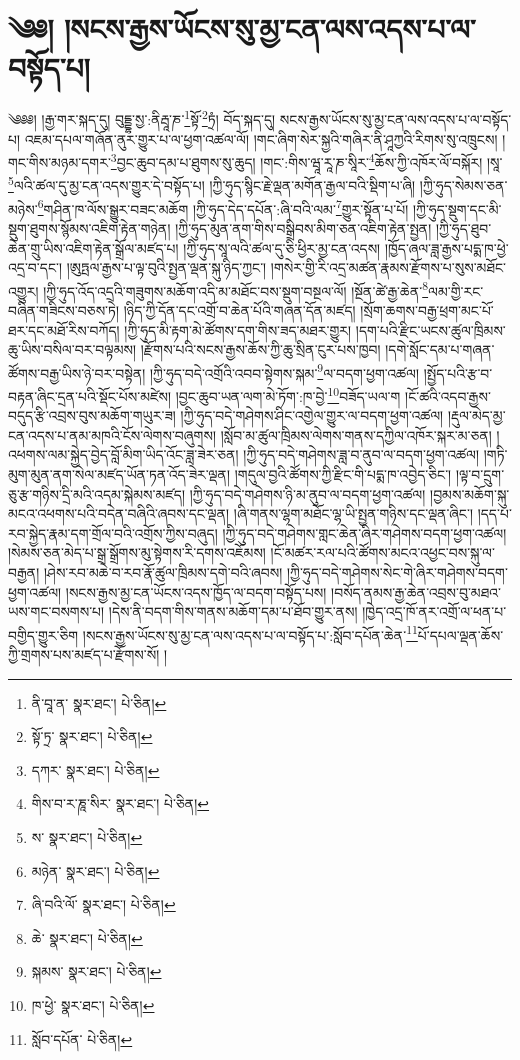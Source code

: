 \setcounter{footnote}{0} 
\chapter{༄༅། །སངས་རྒྱས་ཡོངས་སུ་མྱ་ངན་ལས་འདས་པ་ལ་བསྟོད་པ།}༄༅༅། །རྒྱ་གར་སྐད་དུ། བུདྡྷ་སྱ་:ནིརྦཱ་ཎ་\footnote{ནི་བཱ་ན་  སྣར་ཐང་།  པེ་ཅིན། }སྟོ་\footnote{སྟོ་ཏྲ་  སྣར་ཐང་།  པེ་ཅིན། }ཏྲཾ། བོད་སྐད་དུ། སངས་རྒྱས་ཡོངས་སུ་མྱ་ངན་ལས་འདས་པ་ལ་བསྟོད་པ། འཇམ་དཔལ་གཞོན་ནུར་གྱུར་པ་ལ་ཕྱག་འཚལ་ལོ། །གང་ཞིག་སེར་སྐྱའི་གཞིར་ནི་ཤཱཀྱའི་རིགས་སུ་འཁྲུངས། །གང་གིས་མཉམ་དགར་\footnote{དཀར་  སྣར་ཐང་།  པེ་ཅིན། }བྱང་ཆུབ་དམ་པ་ཐུགས་སུ་ཆུད། །གང་:གིས་ཝཱ་རཱ་ཎ་སཱིར་\footnote{གིས་བ་ར་ཎཱ་སིར་  སྣར་ཐང་།  པེ་ཅིན། }ཆོས་ཀྱི་འཁོར་ལོ་བསྐོར། །སཱ་\footnote{ས་  སྣར་ཐང་།  པེ་ཅིན། }ལའི་ཚལ་དུ་མྱ་ངན་འདས་གྱུར་དེ་བསྟོད་པ། །ཀྱི་ཧུད་སྙིང་རྗེ་ལྡན་མགོན་རྒྱལ་བའི་སྡིག་པ་ཞི། །ཀྱི་ཧུད་སེམས་ཅན་མཉེས་\footnote{མཉེན་  སྣར་ཐང་།  པེ་ཅིན། }གཤིན་ཁ་ལོས་སྒྱུར་བཟང་མཆོག །ཀྱི་ཧུད་དེད་དཔོན་:ཞི་བའི་ལམ་\footnote{ཞི་བའི་ལོ་  སྣར་ཐང་།  པེ་ཅིན། }གྱུར་སྟོན་པ་པོ། །ཀྱི་ཧུད་སྡུག་དང་མི་སྡུག་ཐུགས་སྙོམས་འཇིག་རྟེན་གཉེན། །ཀྱི་ཧུད་མུན་ནག་གིས་བསྒྲིབས་མིག་ཅན་འཇིག་རྟེན་སྤྱན། །ཀྱི་ཧུད་ཐུབ་ཆེན་གྲུ་ཡིས་འཇིག་རྟེན་སྒྲོལ་མཛད་པ། །ཀྱི་ཧུད་སཱ་ལའི་ཚལ་དུ་ཅི་ཕྱིར་མྱ་ངན་འདས། །ཁྱོད་ཞལ་ཟླ་རྒྱས་པདྨ་ཁ་ཕྱེ་འདྲ་བ་དང་། །ཨུཏྤལ་རྒྱས་པ་ལྟ་བུའི་སྤྱན་ལྡན་སྐུ་ཉིད་ཀྱང་། །གསེར་གྱི་རི་འདྲ་མཚན་རྣམས་རྫོགས་པ་སུས་མཐོང་འགྱུར། །ཀྱི་ཧུད་འོད་འདྲའི་གཟུགས་མཆོག་འདི་མ་མཐོང་བས་སྡུག་བསྔལ་ལོ། །སྔོན་ཚེ་རྒྱ་ཆེན་\footnote{ཆེ་  སྣར་ཐང་།  པེ་ཅིན། }ལམ་གྱི་རང་བཞིན་གཟིངས་བཅས་ཏེ། །ཉིད་ཀྱི་དོན་དང་འགྲོ་བ་ཆེན་པོའི་གཞན་དོན་མཛད། །སྲོག་ཆགས་བརྒྱ་ཕྲག་མང་པོ་ཐར་དང་མཐོ་རིས་བཀོད། །ཀྱི་ཧུད་མི་རྟག་མེ་ཚོགས་དག་གིས་ཟད་མཐར་གྱུར། །དག་པའི་རྫིང་ཡངས་ཚུལ་ཁྲིམས་ཆུ་ཡིས་བསིལ་བར་བལྟམས། །རྫོགས་པའི་སངས་རྒྱས་ཆོས་ཀྱི་ཆུ་སྲིན་ངུར་པས་ཁྱབ། །དགེ་སློང་དམ་པ་གཞན་ཚོགས་བརྒྱ་ཡིས་ཉེ་བར་བསྟེན། །ཀྱི་ཧུད་བདེ་འགྲོའི་འབབ་སྟེགས་སྐམ་\footnote{སྐམས་  སྣར་ཐང་།  པེ་ཅིན། }ལ་བདག་ཕྱག་འཚལ། །སྤྱོད་པའི་རྩ་བ་བརྟན་ཞིང་དྲན་པའི་སྡོང་པོས་མཛེས། །བྱང་ཆུབ་ཡན་ལག་མེ་ཏོག་:ཁ་བྱེ་\footnote{ཁ་ཕྱེ་  སྣར་ཐང་།  པེ་ཅིན། }བཟོད་ཡལ་ག །ངོ་ཚའི་འདབ་རྒྱས་བདུད་རྩི་འབྲས་བུས་མཆོག་གཡུར་ཟ། །ཀྱི་ཧུད་བདེ་གཤེགས་ཤིང་འགྱེལ་གྱུར་ལ་བདག་ཕྱག་འཚལ། །རྡུལ་མེད་མྱ་ངན་འདས་པ་ནམ་མཁའི་ངོས་ལེགས་བཞུགས། །སློབ་མ་ཚུལ་ཁྲིམས་ལེགས་གནས་དཀྱིལ་འཁོར་སྐར་མ་ཅན། །འཕགས་ལམ་སྐྱེད་བྱེད་བློ་མིག་ཡིད་འོང་ཟླ་ཟེར་ཅན། །ཀྱི་ཧུད་བདེ་གཤེགས་ཟླ་བ་ནུབ་ལ་བདག་ཕྱག་འཚལ། །གཏི་མུག་མུན་ནག་སེལ་མཛད་ཡོན་ཏན་འོད་ཟེར་ལྡན། །གདུལ་བྱའི་ཚོགས་ཀྱི་རྫིང་གི་པདྨ་ཁ་འབྱེད་ཅིང་། །ལྟ་བ་དྲུག་ཅུ་རྩ་གཉིས་དྲི་མའི་འདམ་སྐེམས་མཛད། །ཀྱི་ཧུད་བདེ་གཤེགས་ཉི་མ་ནུབ་ལ་བདག་ཕྱག་འཚལ། །བྱམས་མཆོག་སྐུ་མངའ་འཕགས་པའི་བདེན་བཞིའི་ཞབས་དང་ལྡན། །ཞི་གནས་ལྷག་མཐོང་ལྷ་ཡི་སྤྱན་གཉིས་དང་ལྡན་ཞིང་། །དད་པ་རབ་སྐྱེད་རྣམ་དག་གྲོལ་བའི་འགྲོས་ཀྱིས་བཞུད། །ཀྱི་ཧུད་བདེ་གཤེགས་གླང་ཆེན་ཞིར་གཤེགས་བདག་ཕྱག་འཚལ། །སེམས་ཅན་མེད་པ་སྒྲ་སྒྲོགས་མུ་སྟེགས་རི་དགས་འཇོམས། །ངོ་མཚར་རལ་པའི་ཚོགས་མངའ་འཕྱང་བས་སྐུ་ལ་བརྒྱན། །ཤེས་རབ་མཆེ་བ་རབ་རྣོ་ཚུལ་ཁྲིམས་དགེ་བའི་ཞབས། །ཀྱི་ཧུད་བདེ་གཤེགས་སེང་གེ་ཞིར་གཤེགས་བདག་ཕྱག་འཚལ། །སངས་རྒྱས་མྱ་ངན་ཡོངས་འདས་ཁྱོད་ལ་བདག་བསྟོད་པས། །བསོད་ནམས་རྒྱ་ཆེན་འབྲས་བུ་མཐའ་ཡས་གང་བསགས་པ། །དེས་ནི་བདག་གིས་གནས་མཆོག་དམ་པ་ཐོབ་གྱུར་ནས། །ཁྱེད་འདྲ་ཁོ་ནར་འགྲོ་ལ་ཕན་པ་བགྱིད་གྱུར་ཅིག །སངས་རྒྱས་ཡོངས་སུ་མྱ་ངན་ལས་འདས་པ་ལ་བསྟོད་པ་:སློབ་དཔོན་ཆེན་\footnote{སློབ་དཔོན་  པེ་ཅིན། }པོ་དཔལ་ལྡན་ཆོས་ཀྱི་གྲགས་པས་མཛད་པ་རྫོགས་སོ། ། 